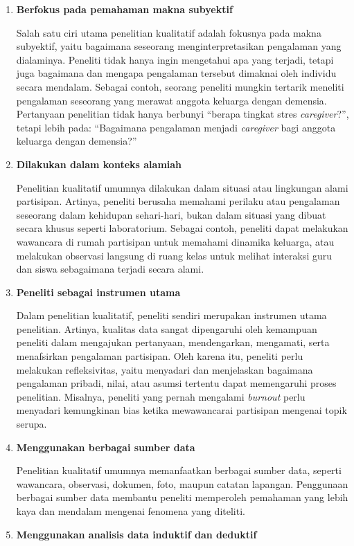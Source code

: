 \documentclass[
  indonesian,
  letterpaper,
  DIV=11,
  numbers=noendperiod]{scrreprt}
\begin{document}
\begin{enumerate}
\def\labelenumi{\arabic{enumi}.}
\item
  \textbf{Berfokus pada pemahaman makna subyektif}

  Salah satu ciri utama penelitian kualitatif adalah fokusnya pada makna
  subyektif, yaitu bagaimana seseorang menginterpretasikan pengalaman
  yang dialaminya. Peneliti tidak hanya ingin mengetahui apa yang
  terjadi, tetapi juga bagaimana dan mengapa pengalaman tersebut
  dimaknai oleh individu secara mendalam. Sebagai contoh, seorang
  peneliti mungkin tertarik meneliti pengalaman seseorang yang merawat
  anggota keluarga dengan demensia. Pertanyaan penelitian tidak hanya
  berbunyi ``berapa tingkat stres \emph{caregiver}?'', tetapi lebih
  pada: ``Bagaimana pengalaman menjadi \emph{caregiver} bagi anggota
  keluarga dengan demensia?''~
\item
  \textbf{Dilakukan dalam konteks alamiah}

  Penelitian kualitatif umumnya dilakukan dalam situasi atau lingkungan
  alami partisipan. Artinya, peneliti berusaha memahami perilaku atau
  pengalaman seseorang dalam kehidupan sehari-hari, bukan dalam situasi
  yang dibuat secara khusus seperti laboratorium. Sebagai contoh,
  peneliti dapat melakukan wawancara di rumah partisipan untuk memahami
  dinamika keluarga, atau melakukan observasi langsung di ruang kelas
  untuk melihat interaksi guru dan siswa sebagaimana terjadi secara
  alami.
\item
  \textbf{Peneliti sebagai instrumen utama}

  Dalam penelitian kualitatif, peneliti sendiri merupakan instrumen
  utama penelitian. Artinya, kualitas data sangat dipengaruhi oleh
  kemampuan peneliti dalam mengajukan pertanyaan, mendengarkan,
  mengamati, serta menafsirkan pengalaman partisipan. Oleh karena itu,
  peneliti perlu melakukan refleksivitas, yaitu menyadari dan
  menjelaskan bagaimana pengalaman pribadi, nilai, atau asumsi tertentu
  dapat memengaruhi proses penelitian. Misalnya, peneliti yang pernah
  mengalami \emph{burnout} perlu menyadari kemungkinan bias ketika
  mewawancarai partisipan mengenai topik serupa.
\item
  \textbf{Menggunakan berbagai sumber data}

  Penelitian kualitatif umumnya memanfaatkan berbagai sumber data,
  seperti wawancara, observasi, dokumen, foto, maupun catatan lapangan.
  Penggunaan berbagai sumber data membantu peneliti memperoleh pemahaman
  yang lebih kaya dan mendalam mengenai fenomena yang diteliti.
\item
  \textbf{Menggunakan analisis data induktif dan deduktif}


\end{enumerate}
\end{document}
